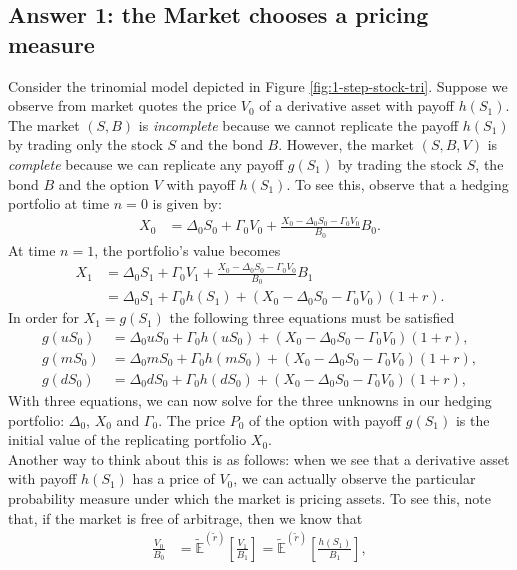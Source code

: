 \documentclass[12pt]{book}
\numberwithin{equation}{chapter}
\theoremstyle{plain}
\numberwithin{theorem}{section}
\theoremstyle{definition}
\numberwithin{exercise}{chapter}
\newcommand{\<}{\langle}
\renewcommand{\>}{\rangle}
\renewcommand{\(}{\left(}
\renewcommand{\)}{\right)}
\renewcommand{\[}{\left[}
\renewcommand{\]}{\right]}
\newcommand\Eb{\mathds{E}}
\newcommand\Ebt{\widetilde{\Eb}}
\newcommand\rt{\widetilde{r}}
\theoremstyle{definition}
\numberwithin{question}{section}
\begin{document}
\subsection{Answer 1: the Market chooses a pricing measure}
Consider the trinomial model depicted in Figure \ref{fig:1-step-stock-tri}.
Suppose we observe from market quotes the price $V_0$ of a derivative asset with payoff $h(S_1)$. 
The market $(S,B)$ is \textit{incomplete} because we cannot replicate the  payoff $h(S_1)$ by trading only the stock $S$ and the bond $B$. 
However, the market $(S, B, V)$ is \textit{complete} because we can replicate any payoff $g(S_1)$ by trading the stock $S$, the bond $B$ and the option $V$ with payoff $h(S_1)$. To see this, observe that a hedging portfolio at time $n=0$ is given by:
\begin{align}
X_0 
	&= \Delta_0 S_0 + \Gamma_0 V_0 + \frac{X_0 - \Delta_0 S_0 - \Gamma_0 V_0}{B_0} B_0.
\end{align}
At time $n=1$, the portfolio's value becomes
\begin{align}
X_1 
	&= \Delta_0 S_1 + \Gamma_0 V_1 + \frac{X_0 - \Delta_0 S_0 - \Gamma_0 V_0}{B_0} B_1 \\
	&=	\Delta_0 S_1 + \Gamma_0 h(S_1) + \(X_0 - \Delta_0 S_0 - \Gamma_0 V_0\) (1+r) .
\end{align}
In order for $X_1 = g(S_1)$ the following three equations must be satisfied
\begin{align}
g(u S_0)
	&=	\Delta_0 u S_0 + \Gamma_0 h(u S_0) + \(X_0 - \Delta_0 S_0 - \Gamma_0 V_0\) (1+r) , \\
g(m S_0)
	&=	\Delta_0 m S_0 + \Gamma_0 h(m S_0) + \(X_0 - \Delta_0 S_0 - \Gamma_0 V_0\) (1+r) , \\
g(d S_0)
	&=	\Delta_0 d S_0 + \Gamma_0 h(d S_0) + \(X_0 - \Delta_0 S_0 - \Gamma_0 V_0\) (1+r) ,
\end{align}
With three equations, we can now solve for the three unknowns in our hedging portfolio: $\Delta_0$, $X_0$ and $\Gamma_0$.
The price $P_0$ of the option with payoff $g(S_1)$ is the initial value of the replicating portfolio $X_0$.
\\[0.5em]
Another way to think about this is as follows: when we see that a derivative asset with payoff $h(S_1)$ has a price of $V_0$, we can actually observe the particular probability measure under which the market is pricing assets.  To see this, note that, if the market is free of arbitrage, then we know that
\begin{align}
\frac{V_0}{B_0} 
	&= \Ebt^{(\rt)} \[ \frac{V_1}{B_1} \] = \Ebt^{(\rt)} \[ \frac{h(S_1)}{B_1} \],
\end{align}
\end{document}
